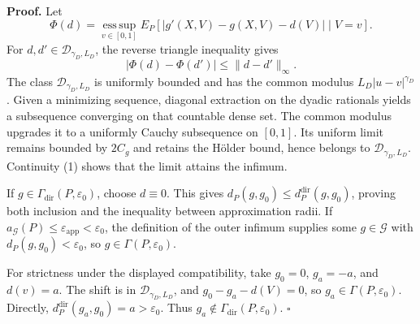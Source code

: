 \textbf{Proof.}
Let
\[
 \Phi(d)=\operatorname*{ess\,sup}_{v\in[0,1]}
 E_P[|g'(X,V)-g(X,V)-d(V)|\mid V=v].
\]
For \(d,d'\in\mathcal D_{\gamma_D,L_D}\), the reverse triangle inequality gives
\[
 |\Phi(d)-\Phi(d')|\le\|d-d'\|_\infty. \tag{1}
\]
The class \(\mathcal D_{\gamma_D,L_D}\) is uniformly bounded and has the common modulus \(L_D|u-v|^{\gamma_D}\).  Given a minimizing sequence, diagonal extraction on the dyadic rationals yields a subsequence converging on that countable dense set.  The common modulus upgrades it to a uniformly Cauchy subsequence on \([0,1]\).  Its uniform limit remains bounded by \(2C_g\) and retains the H\"older bound, hence belongs to \(\mathcal D_{\gamma_D,L_D}\).  Continuity (1) shows that the limit attains the infimum.

If \(g\in\Gamma_{\mathrm{dir}}(P,\varepsilon_0)\), choose \(d\equiv0\).  This gives \(d_P(g,g_0)\le d_P^{\mathrm{dir}}(g,g_0)\), proving both inclusion and the inequality between approximation radii.  If \(a_{\mathcal G}(P)\le\varepsilon_{\mathrm{app}}<\varepsilon_0\), the definition of the outer infimum supplies some \(g\in\mathcal G\) with \(d_P(g,g_0)<\varepsilon_0\), so \(g\in\Gamma(P,\varepsilon_0)\).

For strictness under the displayed compatibility, take \(g_0=0\), \(g_a=-a\), and \(d(v)=a\).  The shift is in \(\mathcal D_{\gamma_D,L_D}\), and \(g_0-g_a-d(V)=0\), so \(g_a\in\Gamma(P,\varepsilon_0)\).  Directly, \(d_P^{\mathrm{dir}}(g_a,g_0)=a>\varepsilon_0\).  Thus \(g_a\notin\Gamma_{\mathrm{dir}}(P,\varepsilon_0)\). \(\square\)